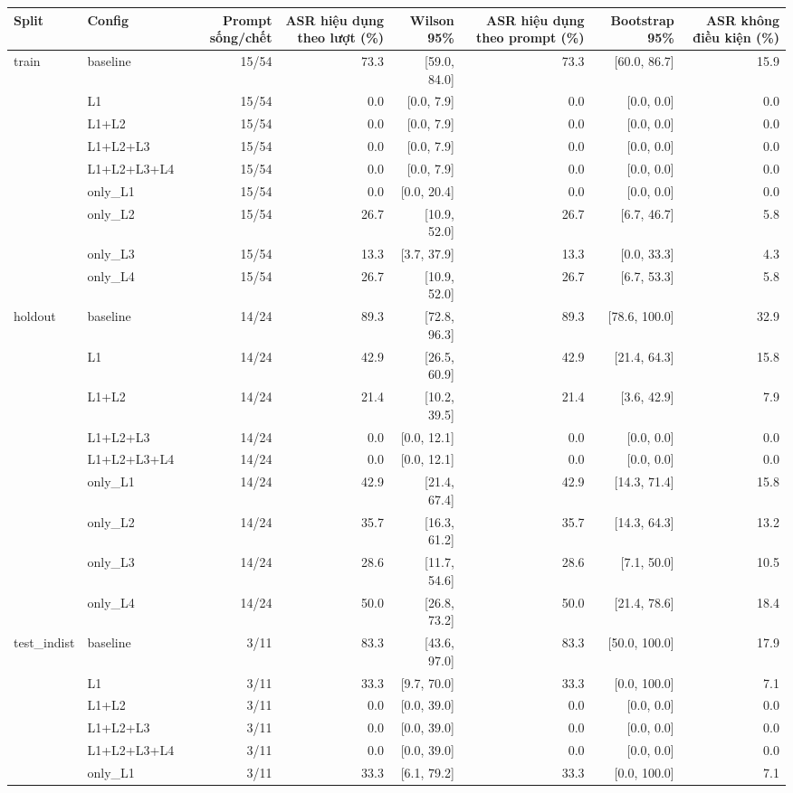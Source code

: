 \begin{tabular}{llrrrrrr}
\toprule
Split & Config & Prompt sống/chết & ASR hiệu dụng theo lượt (\%) & Wilson 95\% & ASR hiệu dụng theo prompt (\%) & Bootstrap 95\% & ASR không điều kiện (\%) \\
\midrule
train & baseline & 15/54 & 73.3 & [59.0, 84.0] & 73.3 & [60.0, 86.7] & 15.9 \\
 & L1 & 15/54 & 0.0 & [0.0, 7.9] & 0.0 & [0.0, 0.0] & 0.0 \\
 & L1+L2 & 15/54 & 0.0 & [0.0, 7.9] & 0.0 & [0.0, 0.0] & 0.0 \\
 & L1+L2+L3 & 15/54 & 0.0 & [0.0, 7.9] & 0.0 & [0.0, 0.0] & 0.0 \\
 & L1+L2+L3+L4 & 15/54 & 0.0 & [0.0, 7.9] & 0.0 & [0.0, 0.0] & 0.0 \\
 & only\_L1 & 15/54 & 0.0 & [0.0, 20.4] & 0.0 & [0.0, 0.0] & 0.0 \\
 & only\_L2 & 15/54 & 26.7 & [10.9, 52.0] & 26.7 & [6.7, 46.7] & 5.8 \\
 & only\_L3 & 15/54 & 13.3 & [3.7, 37.9] & 13.3 & [0.0, 33.3] & 4.3 \\
 & only\_L4 & 15/54 & 26.7 & [10.9, 52.0] & 26.7 & [6.7, 53.3] & 5.8 \\
\midrule
holdout & baseline & 14/24 & 89.3 & [72.8, 96.3] & 89.3 & [78.6, 100.0] & 32.9 \\
 & L1 & 14/24 & 42.9 & [26.5, 60.9] & 42.9 & [21.4, 64.3] & 15.8 \\
 & L1+L2 & 14/24 & 21.4 & [10.2, 39.5] & 21.4 & [3.6, 42.9] & 7.9 \\
 & L1+L2+L3 & 14/24 & 0.0 & [0.0, 12.1] & 0.0 & [0.0, 0.0] & 0.0 \\
 & L1+L2+L3+L4 & 14/24 & 0.0 & [0.0, 12.1] & 0.0 & [0.0, 0.0] & 0.0 \\
 & only\_L1 & 14/24 & 42.9 & [21.4, 67.4] & 42.9 & [14.3, 71.4] & 15.8 \\
 & only\_L2 & 14/24 & 35.7 & [16.3, 61.2] & 35.7 & [14.3, 64.3] & 13.2 \\
 & only\_L3 & 14/24 & 28.6 & [11.7, 54.6] & 28.6 & [7.1, 50.0] & 10.5 \\
 & only\_L4 & 14/24 & 50.0 & [26.8, 73.2] & 50.0 & [21.4, 78.6] & 18.4 \\
\midrule
test\_indist & baseline & 3/11 & 83.3 & [43.6, 97.0] & 83.3 & [50.0, 100.0] & 17.9 \\
 & L1 & 3/11 & 33.3 & [9.7, 70.0] & 33.3 & [0.0, 100.0] & 7.1 \\
 & L1+L2 & 3/11 & 0.0 & [0.0, 39.0] & 0.0 & [0.0, 0.0] & 0.0 \\
 & L1+L2+L3 & 3/11 & 0.0 & [0.0, 39.0] & 0.0 & [0.0, 0.0] & 0.0 \\
 & L1+L2+L3+L4 & 3/11 & 0.0 & [0.0, 39.0] & 0.0 & [0.0, 0.0] & 0.0 \\
 & only\_L1 & 3/11 & 33.3 & [6.1, 79.2] & 33.3 & [0.0, 100.0] & 7.1 \\
\bottomrule
\end{tabular}
